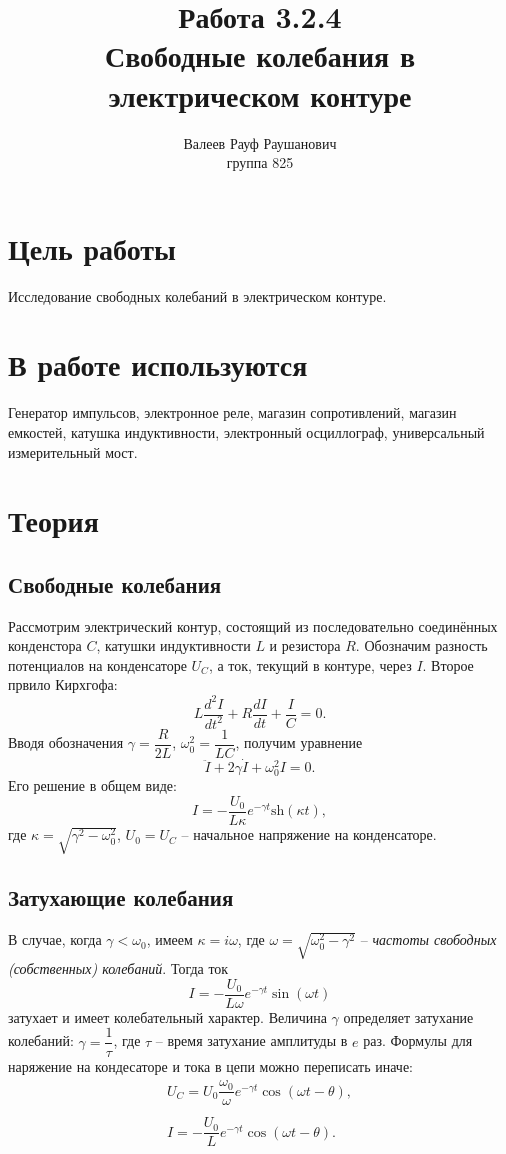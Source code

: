 \documentclass[a4paper, 12pt]{article}%
\author{Валеев Рауф Раушанович \\
группа 825}
\title{\textbf{Работа 3.2.4\\Свободные колебания в электрическом контуре}}
\date{}
\begin{document}
\maketitle
\newpage
\section*{Цель работы}
Исследование свободных колебаний в электрическом контуре.
\section*{В работе используются}
Генератор импульсов, электронное реле, магазин сопротивлений, магазин емкостей, катушка индуктивности, электронный осциллограф, универсальный измерительный мост. 
\section*{Теория}
\subsection*{Свободные колебания}
Рассмотрим электрический контур, состоящий из последовательно соединённых конденстора $C$, катушки индуктивности $L$ и резистора $R$. Обозначим разность потенциалов на конденсаторе $U_C$, а ток, текущий в контуре, через $I$. Второе првило Кирхгофа:
\begin{equation}
L \dfrac{d^2I}{dt^2}+R\dfrac{dI}{dt}+\dfrac{I}{C}=0.
\end{equation}
Вводя обозначения $\gamma = \dfrac{R}{2L}$, $\omega_0^2=\dfrac{1}{LC}$, получим уравнение
\begin{equation}
\ddot{I}+2\gamma\dot{I}+\omega_0^2I=0.
\end{equation}
Его решение в общем виде:
\begin{equation}
I = -\dfrac{U_0}{L\kappa}e^{-\gamma t}\text{sh}(\kappa t), 
\end{equation}
где $\kappa = \sqrt{\gamma^2 - \omega_0^2}$, $U_0 = U_C$ -- начальное напряжение на конденсаторе.

\subsection*{Затухающие колебания}
 В случае, когда $\gamma < \omega_0$, имеем $\kappa = i\omega$, где $\omega = \sqrt{\omega_0^2 - \gamma^2}$ -- \textit{частоты свободных (собственных) колебаний}. Тогда ток
 \begin{equation}
 I = -\dfrac{U_0}{L\omega}e^{-\gamma t}\sin(\omega t)
 \end{equation}
 затухает и имеет колебательный характер. Величина $\gamma$ определяет затухание колебаний: $\gamma = \dfrac{1}{\tau}$, где $\tau$ -- время затухание амплитуды в $e$ раз.
Формулы для наряжение на кондесаторе и тока в цепи можно переписать иначе:
\begin{equation}
\begin{array}{c}
U_C = U_0 \dfrac{\omega_0}{\omega}e^{-\gamma t} \cos(\omega t - \theta),\\
\\
I = -\dfrac{U_0}{L}e^{-\gamma t} \cos(\omega t - \theta).
\end{array}
\end{equation}
\end{document}
